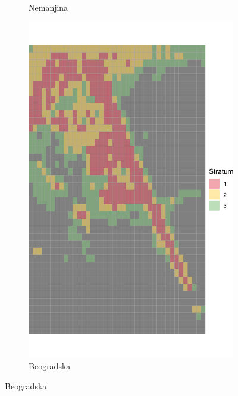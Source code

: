 \documentclass[a4paper,12pt]{article}
\begin{document}
\begin{figure}[H]
\begin{subfigure}[b]{0.3\textwidth}
	  \caption{Nemanjina}
	  \label{fig:nemanjina}
	\end{subfigure}
	\hfill
	\begin{subfigure}[b]{0.3\textwidth}
		\centering
		\includegraphics[width=\textwidth]{../grid_output/strata_viz/beogradska_strata.png}
		\caption{Beogradska}
		\label{fig:beogradska}
	\end{subfigure}
  
	\vspace{0.3cm} %
  

\end{figure}
\end{document}
